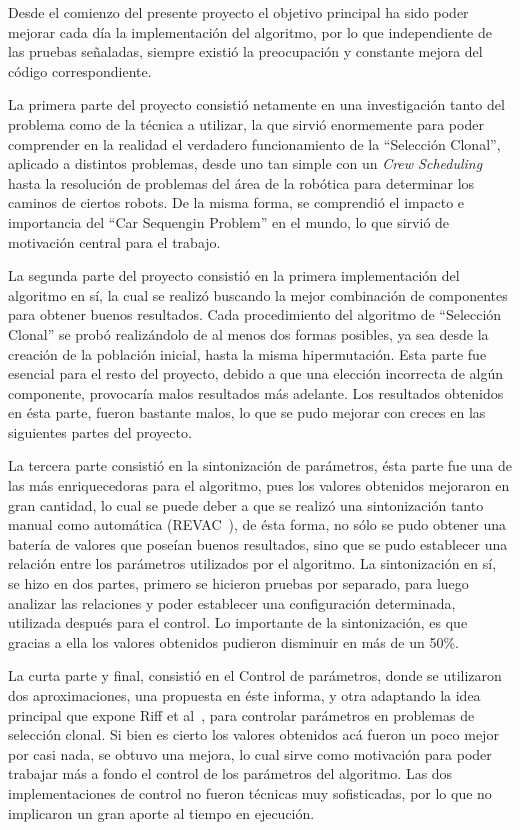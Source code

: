 Desde el comienzo del presente proyecto el objetivo principal ha sido poder
mejorar cada día la implementación del algoritmo, por lo que independiente de las pruebas
señaladas, siempre existió la preocupación y constante mejora del código correspondiente.

La primera parte del proyecto consistió netamente en una investigación tanto del problema
como de la técnica a utilizar, la que sirvió enormemente para poder comprender en la realidad
el verdadero funcionamiento de la ``Selección Clonal'', aplicado a distintos problemas,
desde uno tan simple con un \emph{Crew Scheduling} hasta la resolución de problemas del área
de la robótica para determinar los caminos de ciertos robots. De la misma forma, se comprendió
el impacto e importancia del ``Car Sequengin Problem'' en el mundo, lo que sirvió de motivación
central para el trabajo.

La segunda parte del proyecto consistió en la primera implementación del algoritmo en sí,
la cual se realizó buscando la mejor combinación de componentes para obtener buenos resultados.
Cada procedimiento del algoritmo de ``Selección Clonal'' se probó realizándolo de al menos
dos formas posibles, ya sea desde la creación de la población inicial, hasta la misma hipermutación.
Esta parte fue esencial para el resto del proyecto, debido a que una elección incorrecta de algún
componente, provocaría malos resultados más adelante.
Los resultados obtenidos en ésta parte, fueron bastante malos, lo que se pudo mejorar con creces
en las siguientes partes del proyecto.

La tercera parte consistió en la sintonización de parámetros, ésta parte fue una de las más
enriquecedoras para el algoritmo, pues los valores obtenidos mejoraron en gran cantidad,
lo cual se puede deber a que se realizó una sintonización tanto manual como automática (REVAC~\cite{REVAC}),
de ésta forma, no sólo se pudo obtener una batería de valores que poseían buenos resultados,
sino que se pudo establecer una relación entre los parámetros utilizados por el algoritmo.
La sintonización en sí, se hizo en dos partes, primero se hicieron pruebas por separado,
para luego analizar las relaciones y poder establecer una configuración determinada, utilizada
después para el control. Lo importante de la sintonización, es que gracias a ella los valores
obtenidos pudieron disminuir en más de un 50\%.

La curta parte y final, consistió en el Control de parámetros, donde se utilizaron dos
aproximaciones, una propuesta en éste informa, y otra adaptando la idea principal que expone
Riff et al~\cite{riff}, para controlar parámetros en problemas de selección clonal.
Si bien es cierto los valores obtenidos acá fueron un poco mejor por casi nada,
se obtuvo una mejora, lo cual sirve como motivación para poder trabajar más a fondo el control
de los parámetros del algoritmo. Las dos implementaciones de control no fueron técnicas muy
sofisticadas, por lo que no implicaron un gran aporte al tiempo en ejecución.


